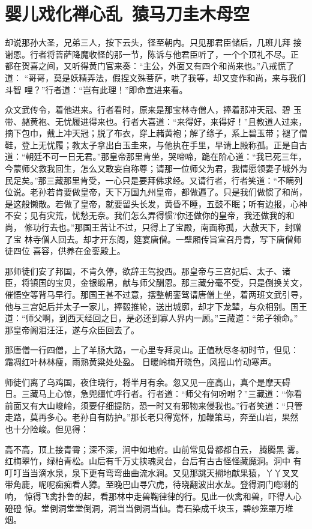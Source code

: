 \chapter{婴儿戏化禅心乱~猿马刀圭木母空}

却说那孙大圣，兄弟三人，按下云头，径至朝内。只见那君臣储后，几班儿拜
接谢恩。行者将菩萨降魔收怪的那一节，陈诉与他君臣听了，一个个顶礼不尽。正
都在贺喜之间，又听得黄门官来奏：“主公，外面又有四个和尚来也。”八戒慌了道：
“哥哥，莫是妖精弄法，假捏文殊菩萨，哄了我等，却又变作和尚，来与我们斗智
哩？”行者道：“岂有此理！”即命宣进来看。

众文武传令，着他进来。行者看时，原来是那宝林寺僧人，捧着那冲天冠、碧
玉带、赭黄袍、无忧履进得来也。行者大喜道：“来得好，来得好！”且教道人过来，
摘下包巾，戴上冲天冠；脱了布衣，穿上赭黄袍；解了绦子，系上碧玉带；褪了僧
鞋，登上无忧履；教太子拿出白玉圭来，与他执在手里，早请上殿称孤。正是自古
道：“朝廷不可一日无君。”那皇帝那里肯坐，哭啼啼，跪在阶心道：“我已死三年，
今蒙师父救我回生，怎么又敢妄自称尊；请那一位师父为君，我情愿领妻子城外为
民足矣。”那三藏那里肯受，一心只是要拜佛求经。又请行者，行者笑道：“不瞒列
位说。老孙若肯要做皇帝，天下万国九州皇帝，都做遍了。只是我们做惯了和尚，
是这般懒散。若做了皇帝，就要留头长发，黄昏不睡，五鼓不眠；听有边报，心神
不安；见有灾荒，忧愁无奈。我们怎么弄得惯?你还做你的皇帝，我还做我的和尚，
修功行去也。”那国王苦让不过，只得上了宝殿，南面称孤，大赦天下，封赠了宝
林寺僧人回去。却才开东阁，筵宴唐僧。一壁厢传旨宣召丹青，写下唐僧师徒四位
喜容，供养在金銮殿上。

那师徒们安了邦国，不肯久停，欲辞王驾投西。那皇帝与三宫妃后、太子、诸
臣，将镇国的宝贝，金银缎帛，献与师父酬恩。那三藏分毫不受，只是倒换关文，
催悟空等背马早行。那国王甚不过意，摆整朝銮驾请唐僧上坐，着两班文武引导，
他与三宫妃后并太子一家儿，捧毂推轮，送出城廓，却才下龙辇，与众相别。国王
道：“师父啊，到西天经回之日，是必还到寡人界内一顾。”三藏道：“弟子领命。”
那皇帝阁泪汪汪，遂与众臣回去了。

那唐僧一行四僧，上了羊肠大路，一心里专拜灵山。正值秋尽冬初时节，但见：
霜凋红叶林林瘦，雨熟黄粱处处盈。
日暖岭梅开晓色，风摇山竹动寒声。

师徒们离了乌鸡国，夜住晓行，将半月有余。忽又见一座高山，真个是摩天碍
日。三藏马上心惊，急兜缰忙呼行者。行者道：“师父有何吩咐？”三藏道：“你看
前面又有大山峻岭，须要仔细提防，恐一时又有邪物来侵我也。”行者笑道：“只管
走路，莫再多心。老孙自有防护。”那长老只得宽怀，加鞭策马，奔至山岩，果然
也十分险峻。但见得：

高不高，顶上接青霄；深不深，涧中如地府。山前常见骨都都白云，腾腾黑
雾。红梅翠竹，绿柏青松。山后有千万丈挟魂灵台，台后有古古怪怪藏魔洞。洞中
有叮叮当当滴水泉，泉下更有弯弯曲曲流水涧。又见那跳天搠地献果猿，丫丫叉叉
带角鹿，呢呢痴痴看人獐。至晚巴山寻穴虎，待晓翻波出水龙。登得洞门唿喇的响，
惊得飞禽扑鲁的起，看那林中走兽鞠律律的行。见此一伙禽和兽，吓得人心磴磴
惊。堂倒洞堂堂倒洞，洞当当倒洞当仙。青石染成千块玉，碧纱笼罩万堆
烟。

